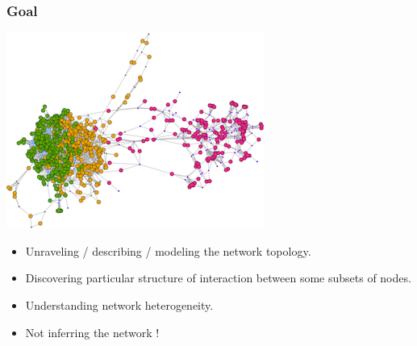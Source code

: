 \documentclass[compress,10pt]{beamer}
\begin{document}

\begin{frame}
 \frametitle{Goal}


 
 
\begin{center}
 \includegraphics[scale=.6]{plots/image_SBM.png}
\end{center}

\begin{itemize}
 \item Unraveling / describing / modeling the network topology. 
 \item Discovering particular structure of interaction between some subsets of nodes.
 \item Understanding network heterogeneity.
 \item Not inferring the network !
 \end{itemize}


\end{frame}



\end{document}
